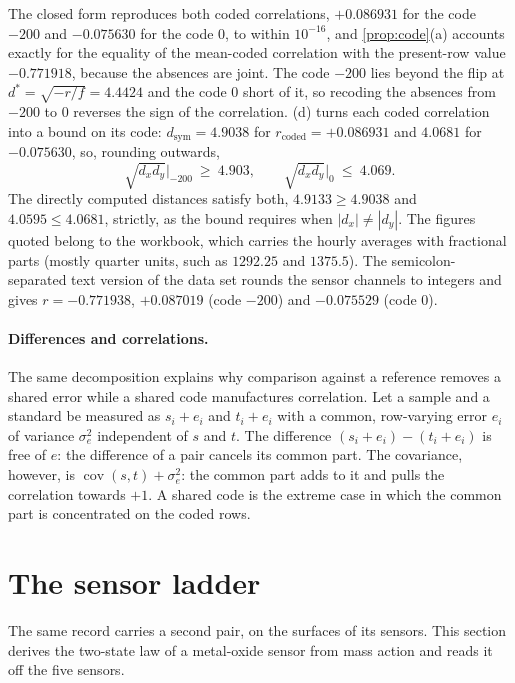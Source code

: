 \documentclass[11pt]{article}
\theoremstyle{definition}\newtheorem{definition}[theorem]{Definition}
\theoremstyle{remark}\newtheorem{remark}[theorem]{Remark}
\begin{document}
The closed form reproduces both coded correlations, $+0.086931$ for the code $-200$ and $-0.075630$ for the code $0$, to within $10^{-16}$, and \cref{prop:code}(a) accounts exactly for the equality of the mean-coded correlation with the present-row value $-0.771918$, because the absences are joint. The code $-200$ lies beyond the flip at $d^*=\sqrt{-r/f}=4.4424$ and the code $0$ short of it, so recoding the absences from $-200$ to $0$ reverses the sign of the correlation. (d) turns each coded correlation into a bound on its code: $d_{\mathrm{sym}}=4.9038$ for $r_{\mathrm{coded}}=+0.086931$ and $4.0681$ for $-0.075630$, so, rounding outwards,
\[
\sqrt{d_xd_y}\big|_{-200}\ \ge\ 4.903,\qquad\sqrt{d_xd_y}\big|_{0}\ \le\ 4.069 .
\]
The directly computed distances satisfy both, $4.9133\ge4.9038$ and $4.0595\le4.0681$, strictly, as the bound requires when $|d_x|\ne|d_y|$. The figures quoted belong to the workbook, which carries the hourly averages with fractional parts (mostly quarter units, such as $1292.25$ and $1375.5$). The semicolon-separated text version of the data set rounds the sensor channels to integers and gives $r=-0.771938$, $+0.087019$ (code $-200$) and $-0.075529$ (code $0$).

\paragraph{Differences and correlations.} The same decomposition explains why comparison against a reference removes a shared error while a shared code manufactures correlation. Let a sample and a standard be measured as $s_i+e_i$ and $t_i+e_i$ with a common, row-varying error $e_i$ of variance $\sigma_e^2$ independent of $s$ and $t$. The difference $(s_i+e_i)-(t_i+e_i)$ is free of $e$: the difference of a pair cancels its common part. The covariance, however, is $\operatorname{cov}(s,t)+\sigma_e^2$: the common part adds to it and pulls the correlation towards $+1$. A shared code is the extreme case in which the common part is concentrated on the coded rows.

\section{The sensor ladder}\label{sec:sensor}
The same record carries a second pair, on the surfaces of its sensors. This section derives the two-state law of a metal-oxide sensor from mass action and reads it off the five sensors.
\end{document}
